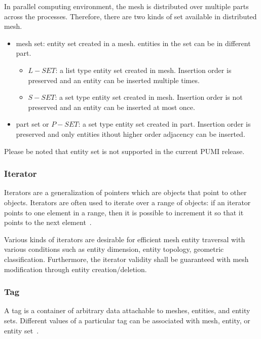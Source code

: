 In parallel computing environment, the mesh is distributed over multiple parts across the processes. Therefore, there are two kinds of set available in distributed mesh.
\begin{itemize}
\item mesh set: entity set created in a mesh. entities in the set can be in different part.
  \begin{itemize}
    \item $L-SET$: a list type entity set created in mesh. Insertion order is preserved and an entity can be inserted multiple times.
    \item $S-SET$: a set type entity set created in mesh. Insertion order is not preserved and an entity can be inserted at most once.
\end{itemize}
\item  part set or $P-SET$: a set type entity set created in part. Insertion order is preserved and only entities ithout higher order adjacency can be inserted. 
\end{itemize}

Please be noted that entity set is not supported in the current PUMI release.

\subsubsection{Iterator}

Iterators are a generalization of pointers which are objects that point to other objects. Iterators are often used to iterate over a range of objects: if an iterator points to one element in a range, then it is possible to increment it so that it points to the next element~\cite{sgiweb}. 

Various kinds of iterators are desirable for efficient mesh entity traversal with various conditions such as entity dimension, entity topology, geometric classification. Furthermore, the iterator validity shall be guaranteed with mesh modification through entity creation/deletion.

\subsubsection{Tag}\label{tag}

A tag is a container of arbitrary data attachable to meshes, entities, and entity sets. Different values of a particular tag can be associated with mesh, entity, or entity set~\cite{itapsweb, Ollivier-etal06}. 

